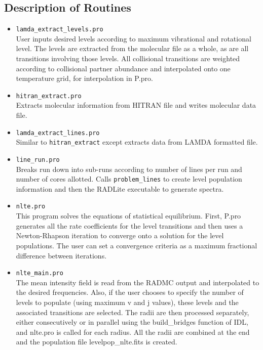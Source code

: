 \documentclass[11pt]{article}
\begin{document}
\subsection{Description of Routines}

\begin{itemize}

\item{\tt lamda\_extract\_levels.pro}\\
User inputs desired levels according to maximum vibrational and rotational level.  The levels are extracted from the molecular file as a whole, as are all transitions involving those levels.  All collisional transitions are weighted according to collisional partner abundance and interpolated onto one temperature grid, for interpolation in P.pro.

\item {\tt hitran\_extract.pro}\\
Extracts molecular information from HITRAN file and writes molecular data file.

\item {\tt lamda\_extract\_lines.pro}\\
Similar to {\tt hitran\_extract} except extracts data from LAMDA formatted file.

\item {\tt line\_run.pro}\\
Breaks run down into sub-runs according to number of lines per run and number of cores allotted.  Calls {\tt problem\_lines} to create level population information and then the RADLite executable to generate spectra.

\item{\tt nlte.pro}\\
This program solves the equations of statistical equilibrium.  First, P.pro generates all the rate coefficients for the level transitions and then uses a Newton-Rhapson iteration to converge onto a solution for the level populations.  The user can set a convergence criteria as a maximum fractional difference between iterations.  

\item{\tt nlte\_main.pro}\\
The mean intensity field is read from the RADMC output and interpolated to the desired frequencies.  Also, if the user chooses to specify the number of levels to populate (using maximum v and j values), these levels and the associated transitions are selected.  The radii are then processed separately, either consecutively or in parallel using the build\_bridges function of IDL, and nlte.pro is called for each radius.  All the radii are combined at the end and the population file levelpop\_nlte.fits is created.


\end{itemize}
\end{document}
